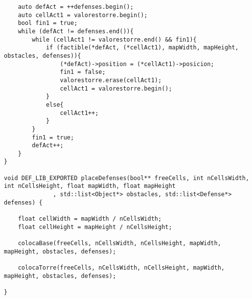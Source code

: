 \begin{lstlisting}
    auto defAct = ++defenses.begin();
    auto cellAct1 = valorestorre.begin();
    bool fin1 = true;
    while (defAct != defenses.end()){
        while (cellAct1 != valorestorre.end() && fin1){
            if (factible(*defAct, (*cellAct1), mapWidth, mapHeight, obstacles, defenses)){
                (*defAct)->position = (*cellAct1)->posicion;
                fin1 = false;
                valorestorre.erase(cellAct1);
                cellAct1 = valorestorre.begin();
            }
            else{
                cellAct1++;
            }
        }
        fin1 = true;
        defAct++;
    }
}

void DEF_LIB_EXPORTED placeDefenses(bool** freeCells, int nCellsWidth, int nCellsHeight, float mapWidth, float mapHeight
              , std::list<Object*> obstacles, std::list<Defense*> defenses) {

    float cellWidth = mapWidth / nCellsWidth;
    float cellHeight = mapHeight / nCellsHeight; 
    
    colocaBase(freeCells, nCellsWidth, nCellsHeight, mapWidth, mapHeight, obstacles, defenses);

    colocaTorre(freeCells, nCellsWidth, nCellsHeight, mapWidth, mapHeight, obstacles, defenses);

}
\end{lstlisting}